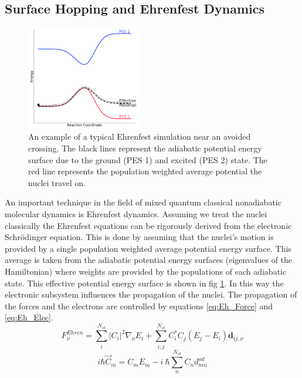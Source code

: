 \subsection{Surface Hopping and Ehrenfest Dynamics \label{sec:Ehren_SH}}
\begin{figure}
  \includegraphics[width=0.45\textwidth]{./img/Eh_hop.png}
  \caption{\label{fig:Eh_diag}An example of a typical Ehrenfest simulation near an avoided crossing. The black lines represent the adiabatic potential energy surface due to the ground (PES 1) and excited (PES 2) state. The red line represents the population weighted average potential the nuclei travel on.}
\end{figure}
An important technique in the field of mixed quantum classical nonadiabatic molecular dynamics is Ehrenfest dynamics. Assuming we treat the nuclei classically the Ehrenfest equations can be rigorously derived from the electronic Schr\"odinger equation. This is done by assuming that the nuclei's motion is provided by a single population weighted average potential energy surface. This average is taken from the adiabatic potential energy surfaces (eigenvalues of the Hamiltonian) where weights are provided by the populations of each adiabatic state. This effective potential energy surface is shown in fig \ref{fig:Eh_diag}. In this way the electronic subsystem influences the propagation of the nuclei. The propagation of the forces and the electrons are controlled by equations \eqref{eq:Eh_Force} and \eqref{eq:Eh_Elec}.
\\
\begin{equation}
  F_{\nu}^{Ehren} = \sum_i^{N_{st}} |C_{i}|^2 \nabla_{\nu} E_{i} + \sum_{i,j}^{N_{st}} C_{i}^{*} C_{j} (E_{j} - E_{i}) \mathbf{d}_{ij, \nu}
  \label{eq:Eh_Force}
\end{equation}
\begin{equation}
  i \hbar \vec{C}_{m} = C_{m}E_{m} -  i \ \hbar  \sum_{n}^{N_{st}} C_{n} d^{ad}_{mn}
  \label{eq:Eh_Elec}
\end{equation}
